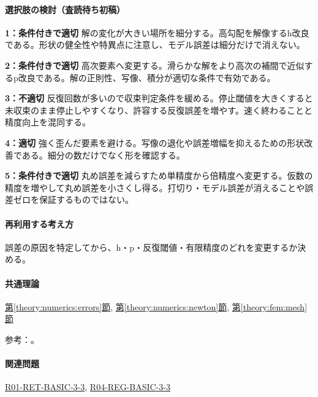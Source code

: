 \paragraph{選択肢の検討（査読待ち初稿）}\mbox{}\par

\noindent\textbf{1：条件付きで適切} 解の変化が大きい場所を細分する。高勾配を解像するh改良である。形状の健全性や特異点に注意し、モデル誤差は細分だけで消えない。\par

\noindent\textbf{2：条件付きで適切} 高次要素へ変更する。滑らかな解をより高次の補間で近似するp改良である。解の正則性、写像、積分が適切な条件で有効である。\par

\noindent\textbf{3：不適切} 反復回数が多いので収束判定条件を緩める。停止閾値を大きくすると未収束のまま停止しやすくなり、許容する反復誤差を増やす。速く終わることと精度向上を混同する。\par

\noindent\textbf{4：適切} 強く歪んだ要素を避ける。写像の退化や誤差増幅を抑えるための形状改善である。細分の数だけでなく形を確認する。\par

\noindent\textbf{5：条件付きで適切} 丸め誤差を減らすため単精度から倍精度へ変更する。仮数の精度を増やして丸め誤差を小さくし得る。打切り・モデル誤差が消えることや誤差ゼロを保証するものではない。\par

\paragraph{再利用する考え方} 誤差の原因を特定してから、h・p・反復閾値・有限精度のどれを変更するか決める。

\paragraph{共通理論} \hyperref[theory:numerics:errors]{第\ref*{theory:numerics:errors}節}, \hyperref[theory:numerics:newton]{第\ref*{theory:numerics:newton}節}, \hyperref[theory:fem:mesh]{第\ref*{theory:fem:mesh}節}

\par 参考：\cite{mit_roy_fea1999,goldberg1991,nist_newton}。

\paragraph{関連問題} \hyperref[q:r01-ret-basic-3-3]{R01-RET-BASIC-3-3}, \hyperref[q:r04-reg-basic-3-3]{R04-REG-BASIC-3-3}

